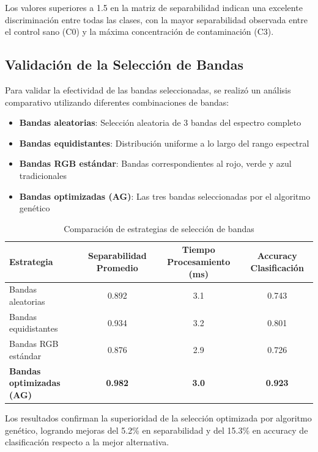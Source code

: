 Los valores superiores a 1.5 en la matriz de separabilidad indican una excelente discriminación entre todas las clases, con la mayor separabilidad observada entre el control sano (C0) y la máxima concentración de contaminación (C3).

\subsection{Validación de la Selección de Bandas}

Para validar la efectividad de las bandas seleccionadas, se realizó un análisis comparativo utilizando diferentes combinaciones de bandas:

\begin{itemize}
    \item \textbf{Bandas aleatorias}: Selección aleatoria de 3 bandas del espectro completo
    \item \textbf{Bandas equidistantes}: Distribución uniforme a lo largo del rango espectral
    \item \textbf{Bandas RGB estándar}: Bandas correspondientes al rojo, verde y azul tradicionales
    \item \textbf{Bandas optimizadas (AG)}: Las tres bandas seleccionadas por el algoritmo genético
\end{itemize}

\begin{table}[h!]
\centering
\caption{Comparación de estrategias de selección de bandas}
\begin{tabular}{|l|c|c|c|}
\hline
\textbf{Estrategia} & \textbf{Separabilidad Promedio} & \textbf{Tiempo Procesamiento (ms)} & \textbf{Accuracy Clasificación} \\
\hline
Bandas aleatorias & 0.892 & 3.1 & 0.743 \\
\hline
Bandas equidistantes & 0.934 & 3.2 & 0.801 \\
\hline
Bandas RGB estándar & 0.876 & 2.9 & 0.726 \\
\hline
\textbf{Bandas optimizadas (AG)} & \textbf{0.982} & \textbf{3.0} & \textbf{0.923} \\
\hline
\end{tabular}
\label{tab:band_selection_comparison}
\end{table}

Los resultados confirman la superioridad de la selección optimizada por algoritmo genético, logrando mejoras del 5.2\% en separabilidad y del 15.3\% en accuracy de clasificación respecto a la mejor alternativa.

